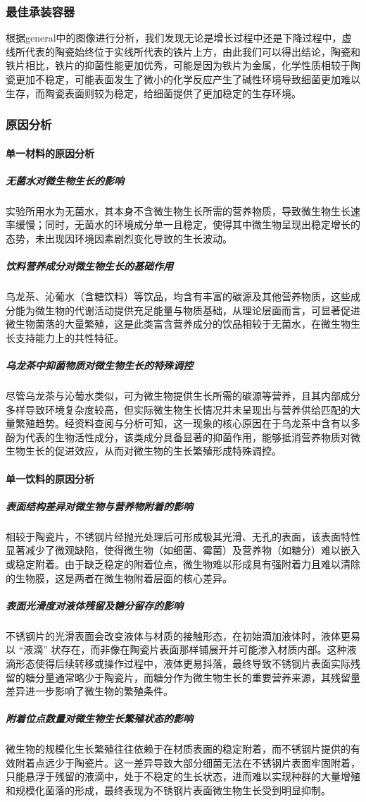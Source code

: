 \documentclass[12pt,a4paper]{ctexart}
\begin{document}
\subsubsection{最佳承装容器}
根据general中的图像进行分析，我们发现无论是增长过程中还是下降过程中，虚线所代表的陶瓷始终位于实线所代表的铁片上方，由此我们可以得出结论，陶瓷和铁片相比，铁片的抑菌性能更加优秀，可能是因为铁片为金属，化学性质相较于陶瓷更加不稳定，可能表面发生了微小的化学反应产生了碱性环境导致细菌更加难以生存，而陶瓷表面则较为稳定，给细菌提供了更加稳定的生存环境。

\subsubsection{原因分析}
\paragraph{单一材料的原因分析}
\subparagraph{无菌水对微生物生长的影响}
实验所用水为无菌水，其本身不含微生物生长所需的营养物质，导致微生物生长速率缓慢；同时，无菌水的环境成分单一且稳定，使得其中微生物呈现出稳定增长的态势，未出现因环境因素剧烈变化导致的生长波动。
\subparagraph{饮料营养成分对微生物生长的基础作用}
乌龙茶、沁葡水（含糖饮料）等饮品，均含有丰富的碳源及其他营养物质，这些成分能为微生物的代谢活动提供充足能量与物质基础，从理论层面而言，可显著促进微生物菌落的大量繁殖，这是此类富含营养成分的饮品相较于无菌水，在微生物生长支持能力上的共性特征。
\subparagraph{乌龙茶中抑菌物质对微生物生长的特殊调控}
尽管乌龙茶与沁葡水类似，可为微生物提供生长所需的碳源等营养，且其内部成分多样导致环境复杂度较高，但实际微生物生长情况并未呈现出与营养供给匹配的大量繁殖趋势。经资料查阅与分析可知，这一现象的核心原因在于乌龙茶中含有以多酚为代表的生物活性成分\cite{HXSJ202002001}，该类成分具备显著的抑菌作用，能够抵消营养物质对微生物生长的促进效应，从而对微生物的生长繁殖形成特殊调控。

\paragraph{单一饮料的原因分析}
\subparagraph{表面结构差异对微生物与营养物附着的影响}
相较于陶瓷片，不锈钢片经抛光处理后可形成极其光滑、无孔的表面，该表面特性显著减少了微观缺陷，使得微生物（如细菌、霉菌）及营养物（如糖分）难以嵌入或稳定附着。由于缺乏稳定的附着位点，微生物难以形成具有强附着力且难以清除的生物膜，这是两者在微生物附着层面的核心差异。
\subparagraph{表面光滑度对液体残留及糖分留存的影响}
不锈钢片的光滑表面会改变液体与材质的接触形态，在初始滴加液体时，液体更易以 “液滴” 状存在，而非像在陶瓷片表面那样铺展开并可能渗入材质内部。这种液滴形态使得后续转移或操作过程中，液体更易抖落，最终导致不锈钢片表面实际残留的糖分量通常略少于陶瓷片，而糖分作为微生物生长的重要营养来源，其残留量差异进一步影响了微生物的繁殖条件。
\subparagraph{附着位点数量对微生物生长繁殖状态的影响}
微生物的规模化生长繁殖往往依赖于在材质表面的稳定附着，而不锈钢片提供的有效附着点远少于陶瓷片。这一差异导致大部分细菌无法在不锈钢片表面牢固附着，只能悬浮于残留的液滴中，处于不稳定的生长状态，进而难以实现种群的大量增殖和规模化菌落的形成，最终表现为不锈钢片表面微生物生长受到明显抑制。
\end{document}
